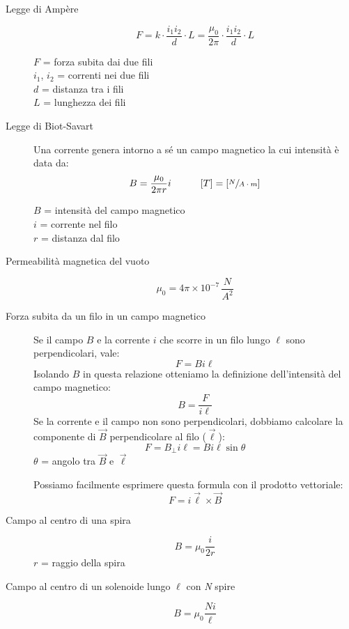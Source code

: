 \documentclass[a4paper,11pt,italian]{article}
\begin{document}
\begin{description}
  \item[Legge di Ampère]
  \[ F = k\cdot  \frac{i_1 i_2}{d}\cdot L = \frac{\mu_0}{2\pi} \cdot \frac{i_1 i_2}{d}\cdot L \]
  \begin{multicols}{2}
  $ F $ = forza subita dai due fili\\
  $ i_1 $, $ i_2 $ = correnti nei due fili\\
  $ d $ = distanza tra i fili\\
  $ L $ = lunghezza dei fili
  \end{multicols}
  
  \item[Legge di Biot-Savart] 
  Una corrente genera intorno a sé un campo magnetico la cui intensità è data da:
  \[ B = \frac{\mu_0}{2\pi r} i \hspace*{3em} [T] = \left[ \sfrac{N}{A\cdot m} \right] \]
  \begin{multicols}{2}
  $ B $ = intensità del campo magnetico\\
  $ i $ = corrente nel filo\\
  $ r $ = distanza dal filo
  \end{multicols}
  
  \item[Permeabilità magnetica del vuoto]
  \[ \mu_0 = 4\pi \times 10^{-7} \, \frac{N}{A^2} \]
  
  \item[Forza subita da un filo in un campo magnetico] 
  Se il campo $ B $ e la corrente $ i $ che scorre in un filo lungo $ \ell $ sono perpendicolari, vale:\[ F = Bi\ell \]
  Isolando $ B $ in questa relazione otteniamo la definizione dell'intensità del campo magnetico:
  \[ B = \frac{F}{i\ell} \]
  Se la corrente e il campo non sono perpendicolari, dobbiamo calcolare la componente di $ \vec{B} $ perpendicolare al filo ($ \vec{\ell} $):
  \[ F = B_{\perp } i\ell = Bi\ell\sin\theta\]
  $ \theta $ = angolo tra $ \vec{B} $ e $ \vec{\ell} $
  
  Possiamo facilmente esprimere questa formula con il prodotto vettoriale:
  \[ F = i \vec{\ell} \times \vec{B} \]
  
  \item[Campo al centro di una spira]
  \[ B = \mu_0 \frac{i}{2r} \]
  $ r $ = raggio della spira
  
  \item[Campo al centro di un solenoide lungo $ \ell $ con \textit{N} spire]
  \[ B = \mu_0 \frac{Ni}{\ell}\]
  

\end{description}
\end{document}
